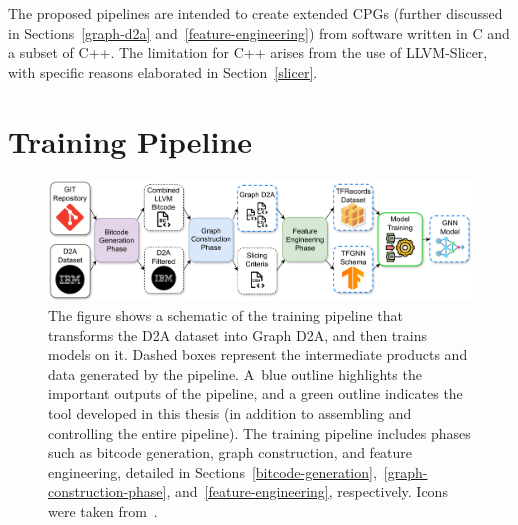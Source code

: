 The proposed pipelines are intended to create extended CPGs (further discussed in Sections~\ref{graph-d2a} and~\ref{feature-engineering}) from software written in C and a subset of C++. The limitation for C++ arises from the use of LLVM-Slicer, with specific reasons elaborated in Section~\ref{slicer}.


\section{Training Pipeline}
\label{training-pipeline}

\begin{figure}[t]
	\centering
	\includegraphics[width=1\textwidth]{figures/training-pipeline.pdf}
	\caption{The figure shows a schematic of the training pipeline that transforms the D2A dataset into Graph D2A, and then trains models on it. Dashed boxes represent the intermediate products and data generated by the pipeline. A~blue outline highlights the important outputs of the pipeline, and a green outline indicates the tool developed in this thesis (in addition to assembling and controlling the entire pipeline). The training pipeline includes phases such as bitcode generation, graph construction, and feature engineering, detailed in Sections~\ref{bitcode-generation},~\ref{graph-construction-phase}, and~\ref{feature-engineering}, respectively. Icons were taken from~\cite{icon-git, icon-ibm, icon-tfrecords, icon-model-training, icon-model}.}
	\label{figure:training-pipeline}
\end{figure}


